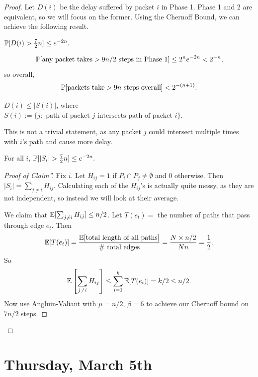 \documentclass[11 pt]{scrartcl}
\begin{document}
\begin{proof}
    Let $D(i)$ be the delay suffered by packet $i$ in Phase 1. Phase 1 and 2 are equivalent, so we will focus on the former. Using the Chernoff Bound, we can achieve the following result. 
    \begin{claim}
        $\mathbb P[D(i) > \frac{7}{2} n] \leq e^{-2n}.$
    \end{claim}
    \begin{corollary}
        \[ \mathbb P[\text{any packet takes}>9n/2\text{ steps in Phase 1}] \leq 2^n e^{-2n} < 2^{-n},\] 
        so overall, 
        \[ \mathbb P[\text{packets take}>9n\text{ steps overall}] < 2^{-(n+1)}.\] 
    \end{corollary}
    
    
    \begin{claim}[Claim']
        $D(i) \leq |S(i)|$, where $S(i) := \{j : \text{ path of packet }j\text{ intersects path of packet }i\}$. 
    \end{claim}
    This is not a trivial statement, as any packet $j$ could intersect multiple times with $i$'s path and cause more delay. 
    \begin{claim}[Claim'']
        For all $i$, $\mathbb P[|S_i| > \frac 72 n] \leq e^{-2n}.$
    \end{claim}
    \begin{proof}[Proof of Claim'']
        Fix $i$. Let $H_{ij} = 1$ if $P_i \cap P_j \not= \emptyset$ and $0$ otherwise. Then $|S_i| = \sum_{j\not= i} H_{ij}$. Calculating each of the $H_{ij}$'s is actually quite messy, as they are not independent, so instead we will look at their average. 

        We claim that $\mathbb E[\sum_{j\not= i} H_{ij}] \leq n/2$. Let $T(e_t) = $ the number of paths that pass through edge $e_t$. Then 
        \[ \mathbb E[T(e_t)] = \dfrac{\mathbb E[\text{total length of all paths}]}{\text{\# total edges}} = \dfrac{N \times n/2}{Nn} = \dfrac{1}{2}.\] 
        So 
        \[ \mathbb E\left[\sum_{j\not= i} H_{ij}\right] \leq \sum_{i=1}^k \mathbb E[T(e_i)] = k/2 \leq n/2.\]
        Now use Angluin-Valiant with $\mu = n/2$, $\beta = 6$ to achieve our Chernoff bound on $7n/2$ steps. 
    \end{proof}
\end{proof}

\newpage
\section{Thursday, March 5th}
\end{document}
